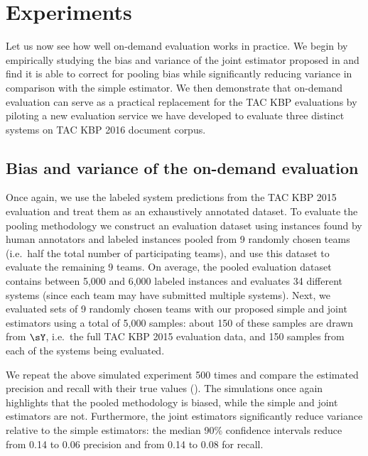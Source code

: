 \section{Experiments}
\label{sec:kbpo:evaluation}

Let us now see how well on-demand evaluation works in practice.
We begin by empirically studying the bias and variance of the joint estimator proposed in  and find it is able to correct for pooling bias while significantly reducing variance in comparison with the simple estimator.
We then demonstrate that on-demand evaluation can serve as a practical replacement for the TAC KBP evaluations by piloting a new evaluation service we have developed to evaluate three distinct systems on TAC KBP 2016 document corpus.

\subsection{Bias and variance of the on-demand evaluation}
Once again, we use the labeled system predictions from the TAC KBP 2015 evaluation and treat them as an exhaustively annotated dataset.
To evaluate the pooling methodology we construct an evaluation dataset using
instances found by human annotators and labeled instances pooled from 9
randomly chosen teams (i.e.\ half the total number of participating teams), and
use this dataset to evaluate the remaining 9 teams.
On average, the pooled evaluation dataset contains between 5,000 and 6,000 labeled instances and evaluates 34 different systems (since each team may have submitted multiple systems).
Next, we evaluated sets of 9 randomly chosen teams with our proposed simple and joint estimators using a total of 5,000 samples:
about 150 of these samples are drawn from $\sY$, i.e.\ the full TAC KBP 2015 evaluation data, and 150 samples from each of the systems being evaluated.

We repeat the above simulated experiment 500 times and compare the estimated precision and recall with their true values ().
The simulations once again highlights that the pooled methodology is biased, while the simple and joint estimators are not.
Furthermore, the joint estimators significantly reduce variance relative to the simple estimators:
the median 90\% confidence intervals reduce from 0.14 to 0.06 precision and from 0.14 to 0.08 for recall.

